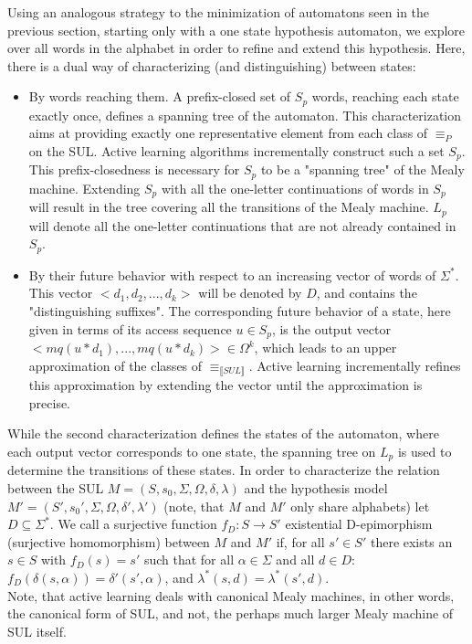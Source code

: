 Using an analogous strategy to the minimization of automatons seen in the previous section, starting only with a one state hypothesis automaton, we explore over all words in the alphabet in order to refine and extend this hypothesis. Here, there is a dual way of characterizing (and distinguishing) between states\cite{Steffen2011}:
\begin{itemize}
	\item By words reaching them. A prefix-closed set of $S_p$ words, reaching each state exactly once, defines a spanning tree of the automaton. This characterization aims at providing exactly one representative element from each class of $\equiv_P$ on the SUL. Active learning algorithms incrementally construct such a set $S_p$. \\This prefix-closedness is necessary for $S_p$ to be a "spanning tree" of the Mealy machine. Extending $S_p$ with all the one-letter continuations of words in $S_p$ will result in the tree covering all the transitions of the Mealy machine. $L_p$ will denote all the one-letter continuations that are not already contained in $S_p$.
	\item By their future behavior with respect to an increasing vector of words of $\Sigma^*$. This vector $<d_1, d_2,...,d_k>$ will be denoted by $D$, and contains the "distinguishing suffixes". The corresponding future behavior of a state, here given in terms of its access sequence $u\in S_p$, is the output vector$<mq(u*d_1), ..., mq(u*d_k)>\in\Omega^k$, which leads to an upper approximation of the classes of $\equiv_{\llbracket SUL\rrbracket}$. Active learning incrementally refines this approximation by extending the vector until the approximation is precise.
\end{itemize}
While the second characterization defines the states of the automaton, where each output vector corresponds to one state, the spanning tree on $L_p$ is used to determine the transitions of these states. In order to characterize the relation between the SUL $M=(S,s_{0},\Sigma,\Omega,\delta,\lambda)$ and the hypothesis model $M'=(S',s_{0}',\Sigma,\Omega,\delta',\lambda')$ (note, that $M$ and $M'$ only share alphabets) let $D\subseteq\Sigma^*$. We call a surjective function $f_D:S\to S'$ existential D-epimorphism (surjective homomorphism) between $M$ and $M'$ if, for all $s'\in S'$ there exists an $s\in S$ with $f_D(s) = s'$ such that for all $\alpha \in \Sigma$ and all $d\in D$: $f_D(\delta(s, \alpha)) = \delta'(s', \alpha)$, and $\lambda^*(s,d) = \lambda^*(s', d)$. \\
Note, that active learning deals with canonical Mealy machines, in other words, the canonical form of SUL, and not, the perhaps much larger Mealy machine of SUL itself. \\

